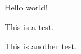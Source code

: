 \documentclass{ximera}
\begin{document}
Hello world!

This is a test.

This is another test.
\end{document}
